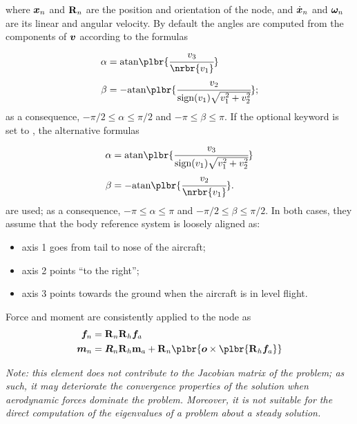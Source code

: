 where $\boldsymbol{x}_n$ and $\bm{\mathbf R}_n$ are the position and orientation
of the node, and $\dot{\boldsymbol{x}}_n$ and $\boldsymbol{\omega}_n$ are its linear
and angular velocity.
By default the angles are computed from the components of $\boldsymbol{v}$
according to the formulas
\begin{subequations}
\begin{align}
	\alpha
	&=
	\text{atan}\plbr{
		\cfrac{v_3}{\nrbr{v_1}}
	}
	\\
	\beta
	&=
	-\text{atan}\plbr{
		\cfrac{v_2}{\text{sign}(v_1)\sqrt{v_1^2 + v_2^2}}
	}
	;
\end{align}
\end{subequations}
as a consequence, $-\pi/2 \le \alpha \le \pi/2$
and $-\pi \le \beta \le \pi$.
If the optional keyword  is set to ,
the alternative formulas
\begin{subequations}
\begin{align}
	\alpha
	&=
	\text{atan}\plbr{
		\cfrac{v_3}{\text{sign}(v_1)\sqrt{v_1^2 + v_2^2}}
	}
	\\
	\beta
	&=
	-\text{atan}\plbr{
		\cfrac{v_2}{\nrbr{v_1}}
	}
	.
\end{align}
\end{subequations}
are used; as a consequence, $-\pi \le \alpha \le \pi$
and $-\pi/2 \le \beta \le \pi/2$.
In both cases, they assume that the body reference system
is loosely aligned as:
\begin{itemize}
\item axis 1 goes from tail to nose of the aircraft;
\item axis 2 points ``to the right'';
\item axis 3 points towards the ground when the aircraft is in level flight.
\end{itemize}
Force and moment are consistently applied to the node as
\begin{subequations}
\begin{align}
	\T{f}_n &= \TT{R}_n \TT{R}_h \T{f}_a
	\\
	\T{m}_n &= \T{R}_n \TT{R}_h \TT{m}_a
		+ \TT{R}_n \plbr{\T{o} \times \plbr{\TT{R}_h \T{f}_a}}
\end{align}
\end{subequations}

\emph{Note: this element does not contribute to the Jacobian matrix
of the problem; as such, it may deteriorate the convergence properties
of the solution when aerodynamic forces dominate the problem.
Moreover, it is not suitable for the direct computation of the eigenvalues
of a problem about a steady solution.}


